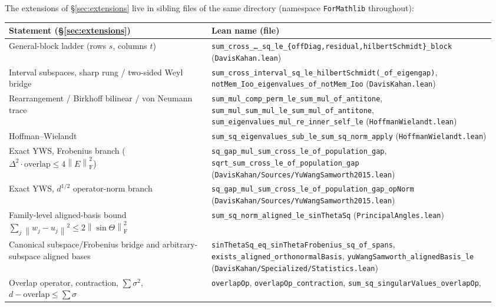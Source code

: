 \documentclass[11pt]{article}
\newcommand{\norm}[1]{\left\lVert #1\right\rVert}
\newcommand{\F}{\mathrm{F}}
\newcommand{\sinT}{\sin\Theta}
\theoremstyle{remark}
\begin{document}
The extensions of \S\ref{sec:extensions} live in sibling files of the same
directory (namespace \texttt{ForMathlib} throughout):

\begin{center}
\footnotesize
\setlength{\tabcolsep}{4pt}
\begin{tabular}{@{}p{0.40\linewidth}p{0.56\linewidth}@{}}
\toprule
Statement (\S\ref{sec:extensions}) & Lean name (file) \\
\midrule
General-block ladder (rows $s$, columns $t$)
  & \texttt{sum\_cross\_\dots\_sq\_le\_\{offDiag,residual,hilbertSchmidt\}\_block} (\texttt{DavisKahan.lean}) \\
Interval subspaces, sharp rung / two-sided Weyl bridge
  & \texttt{sum\_cross\_interval\_sq\_le\_hilbertSchmidt(\_of\_eigengap)},
    \texttt{notMem\_Ioo\_eigenvalues\_of\_notMem\_Ioo} (\texttt{DavisKahan.lean}) \\
Rearrangement / Birkhoff bilinear / von Neumann trace
  & \texttt{sum\_mul\_comp\_perm\_le\_sum\_mul\_of\_antitone},
    \texttt{sum\_mul\_sum\_mul\_le\_sum\_mul\_of\_antitone},
    \texttt{sum\_eigenvalues\_mul\_re\_inner\_self\_le} (\texttt{HoffmanWielandt.lean}) \\
Hoffman--Wielandt
  & \texttt{sum\_sq\_eigenvalues\_sub\_le\_sum\_sq\_norm\_apply} (\texttt{HoffmanWielandt.lean}) \\
Exact YWS, Frobenius branch ($\Delta^2\cdot\text{overlap}\le4\norm{E}_{\F}^2$)
  & \texttt{sq\_gap\_mul\_sum\_cross\_le\_of\_population\_gap},
    \texttt{sqrt\_sum\_cross\_le\_of\_population\_gap} (\texttt{DavisKahan/Sources/YuWangSamworth2015.lean}) \\
Exact YWS, $d^{1/2}$ operator-norm branch
  & \texttt{sq\_gap\_mul\_sum\_cross\_le\_of\_population\_gap\_opNorm} (\texttt{DavisKahan/Sources/YuWangSamworth2015.lean}) \\
Family-level aligned-basis bound $\sum_j\norm{w_j-u_j}^2\le2\norm{\sinT}_{\F}^2$
  & \texttt{sum\_sq\_norm\_aligned\_le\_sinThetaSq} (\texttt{PrincipalAngles.lean}) \\
Canonical subspace/Frobenius bridge and arbitrary-subspace aligned bases
  & \texttt{sinThetaSq\_eq\_sinThetaFrobenius\_sq\_of\_spans},
    \texttt{exists\_aligned\_orthonormalBasis},
    \texttt{yuWangSamworth\_alignedBasis\_le} (\texttt{DavisKahan/Specialized/Statistics.lean}) \\
Overlap operator, contraction, $\sum\sigma^2$, $d-\text{overlap}\le\sum\sigma$
  & \texttt{overlapOp}, \texttt{overlapOp\_contraction},
    \texttt{sum\_sq\_singularValues\_overlapOp},

\end{tabular}
\end{center}
\end{document}
